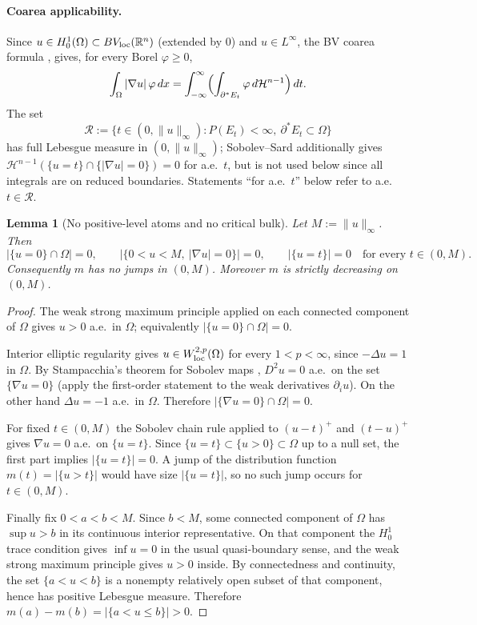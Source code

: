 \documentclass[11pt]{article}
\newtheorem{lemma}[theorem]{Lemma}
\theoremstyle{definition}
\newcommand{\R}{\mathbb{R}}
\newcommand{\Om}{\Omega}
\begin{document}
\paragraph{Coarea applicability.} Since $u\in H^{1}_{0}(\Om)\subset
BV_{\rm loc}(\R^{n})$ (extended by $0$) and $u\in L^{\infty}$, the BV
coarea formula \cite[Thm.~13.1]{Maggi2012}, \cite[Thm.~3.40]{AFP2000}
gives, for every Borel $\varphi\ge 0$,
\begin{equation}\label{eq:coarea}
   \int_{\Om}|\nabla u|\,\varphi\,dx
   =\int_{-\infty}^{\infty}\Bigl(\int_{\partial^{*}E_{t}}\varphi\,d\mathcal
   H^{n-1}\Bigr)\,dt.
\end{equation}
The set
\[
   \mathcal R:=\bigl\{t\in(0,\|u\|_{\infty}):
   P(E_{t})<\infty,\ \partial^{*}E_{t}\subset\Om\bigr\}
\]
has full Lebesgue measure in $(0,\|u\|_{\infty})$; Sobolev--Sard
\cite[App.~A, Thm.~A.1]{FigalliMaggi2011} additionally gives
$\mathcal H^{n-1}(\{u=t\}\cap\{|\nabla u|=0\})=0$ for a.e.\ $t$, but is
not used below since all integrals are on reduced boundaries.
Statements ``for a.e.\ $t$'' below refer to a.e.\ $t\in\mathcal R$.

\begin{lemma}[No positive-level atoms and no critical bulk]\label{lem:noatoms}
Let $M:=\|u\|_{\infty}$. Then
\[
   |\{u=0\}\cap\Om|=0,\qquad
   |\{0<u<M,\ |\nabla u|=0\}|=0,
   \qquad
   |\{u=t\}|=0\quad\text{for every }t\in(0,M).
\]
Consequently $m$ has no jumps in $(0,M)$.
Moreover $m$ is strictly decreasing on $(0,M)$.
\end{lemma}

\begin{proof}
The weak strong maximum principle applied on each connected component of
$\Om$ gives $u>0$ a.e.\ in $\Om$; equivalently
$|\{u=0\}\cap\Om|=0$.

Interior elliptic regularity gives $u\in W^{2,p}_{\rm loc}(\Om)$ for every
$1<p<\infty$, since $-\Delta u=1$ in $\Om$.  By Stampacchia's theorem for
Sobolev maps \cite{Stampacchia1965}, $D^{2}u=0$ a.e.\ on the set
$\{\nabla u=0\}$ (apply the first-order statement to the weak derivatives
$\partial_i u$).  On the other hand $\Delta u=-1$ a.e.\ in $\Om$.  Therefore
$|\{\nabla u=0\}\cap\Om|=0$.

For fixed $t\in(0,M)$ the Sobolev chain rule applied to $(u-t)^{+}$ and
$(t-u)^{+}$ gives $\nabla u=0$ a.e.\ on $\{u=t\}$.  Since $\{u=t\}\subset
\{u>0\}\subset\Om$ up to a null set, the first part implies
$|\{u=t\}|=0$.  A jump of the distribution function $m(t)=|\{u>t\}|$
would have size $|\{u=t\}|$, so no such jump occurs for $t\in(0,M)$.

Finally fix $0<a<b<M$.  Since $b<M$, some connected component of $\Om$
has $\sup u>b$ in its continuous interior representative.  On that
component the $H^1_0$ trace condition gives $\inf u=0$ in the usual
quasi-boundary sense, and the weak strong maximum principle gives
$u>0$ inside.  By connectedness and continuity, the set
$\{a<u<b\}$ is a nonempty relatively open subset of that component,
hence has positive Lebesgue measure.  Therefore
$m(a)-m(b)=|\{a<u\le b\}|>0$.
\end{proof}
\end{document}
